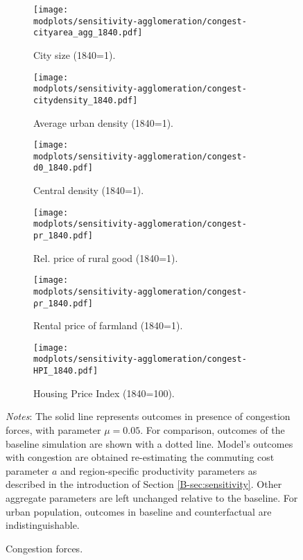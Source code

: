 \documentclass[11pt]{report}
\newcommand{\round}{revision3}  %
\newcommand{\modplots}{../../output/model/plots/\round}
\newcommand{\pthree}{0.37}  %
\newcommand{\parboxadjust}{1.1}
\begin{document}
\begin{figure}
	\begin{adjustbox}{center}
		\parbox{\parboxadjust\textwidth}{\lineskip=0pt
			
			\begin{subfigure}{\pthree\textwidth}
				\texttt{[image: \\modplots/sensitivity-agglomeration/congest-cityarea\_agg\_1840.pdf]}
				\caption{City size (1840=1).\label{B-fig:model-sensi-congest-area}}
			\end{subfigure}%
			\begin{subfigure}{\pthree\textwidth}
				\texttt{[image: \\modplots/sensitivity-agglomeration/congest-citydensity\_1840.pdf]}
				\caption{Average urban density (1840=1).\label{B-fig:model-sensi-congest-avgd}}
			\end{subfigure}%
			\begin{subfigure}{\pthree\textwidth}
				\texttt{[image: \\modplots/sensitivity-agglomeration/congest-d0\_1840.pdf]}
				\caption{Central density (1840=1).\label{B-fig:model-sensi-congest-d0}}
			\end{subfigure}
			
			\begin{subfigure}{\pthree\textwidth}
				\texttt{[image: \\modplots/sensitivity-agglomeration/congest-pr\_1840.pdf]}
				\caption{Rel. price of rural good (1840=1).\label{B-fig:model-sensi-congest-pr}}
			\end{subfigure}%
			\begin{subfigure}{\pthree\textwidth}
				\texttt{[image: \\modplots/sensitivity-agglomeration/congest-ρr\_1840.pdf]}
				\caption{Rental price of farmland (1840=1).\label{B-fig:model-sensi-congest-rhor}}
			\end{subfigure}%
			\begin{subfigure}{\pthree\textwidth}
				\texttt{[image: \\modplots/sensitivity-agglomeration/congest-HPI\_1840.pdf]}
				\caption{Housing Price Index (1840=100).\label{B-fig:model-sensi-congest-hpi}}
			\end{subfigure}
		}
	\end{adjustbox}
	\caption{Congestion forces.\label{B-fig:model-sensi-congest}}
	{\footnotesize \textit{Notes}: The solid line represents outcomes in presence of congestion forces, with parameter $\mu=0.05$. For comparison, outcomes of the baseline simulation are shown with a dotted line. Model's outcomes with congestion are obtained re-estimating the commuting cost parameter $a$ and region-specific productivity parameters as described in the introduction of Section \ref{B-sec:sensitivity}. Other aggregate parameters are left unchanged relative to the baseline. For urban population, outcomes in baseline and counterfactual are indistinguishable.}
\end{figure}
\end{document}
